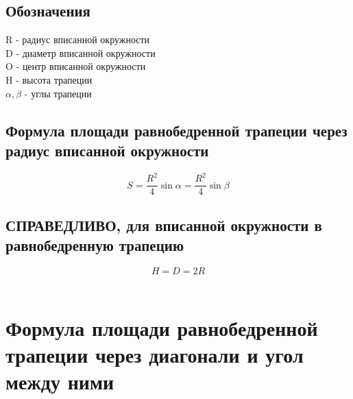\documentclass[a4paper,12pt]{article}
\begin{document}
\subsection{Обозначения}

R - радиус вписанной окружности \\
D - диаметр вписанной окружности \\
O - центр вписанной окружности \\
H - высота трапеции \\
$\alpha, \beta$ - углы трапеции

\subsection{Формула площади равнобедренной трапеции через радиус вписанной окружности}

\[ S = \frac{R^2}{4}\sin\alpha = \frac{R^2}{4}\sin\beta \]

\subsection{СПРАВЕДЛИВО, для вписанной окружности в равнобедренную трапецию}

\[ H = D = 2R \] \\

\newpage
\section{Формула площади равнобедренной трапеции через диагонали и угол между ними}
\end{document}
